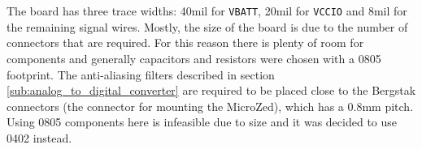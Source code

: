 \\~\\
The board has three trace widths: 40mil for \texttt{VBATT}, 20mil for \texttt{VCCIO} and 8mil for the remaining signal wires.
Mostly, the size of the board is due to the number of connectors that are required.
For this reason there is plenty of room for components and generally capacitors and resistors were chosen with a 0805 footprint.
The anti-aliasing filters described in section \ref{sub:analog_to_digital_converter} are required to be placed close to the Bergstak connectors (the connector for mounting the MicroZed), which has a 0.8mm pitch.
Using 0805 components here is infeasible due to size and it was decided to use 0402 instead.
